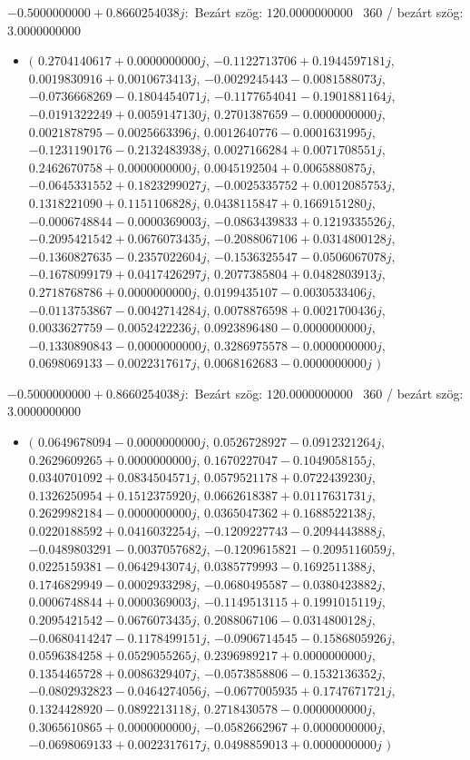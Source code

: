 \documentclass[14pt,a4paper]{article}
\begin{document}
$-0.5000000000+0.8660254038j$:\
Bezárt szög: $120.0000000000$ \
360 / bezárt szög: $3.0000000000$\
\begin{itemize}
\item
$\big($
$0.2704140617+0.0000000000j$, $-0.1122713706+0.1944597181j$, $0.0019830916+0.0010673413j$, $-0.0029245443-0.0081588073j$, $-0.0736668269-0.1804454071j$, $-0.1177654041-0.1901881164j$, $-0.0191322249+0.0059147130j$, $0.2701387659-0.0000000000j$, $0.0021878795-0.0025663396j$, $0.0012640776-0.0001631995j$, $-0.1231190176-0.2132483938j$, $0.0027166284+0.0071708551j$, $0.2462670758+0.0000000000j$, $0.0045192504+0.0065880875j$, $-0.0645331552+0.1823299027j$, $-0.0025335752+0.0012085753j$, $0.1318221090+0.1151106828j$, $0.0438115847+0.1669151280j$, $-0.0006748844-0.0000369003j$, $-0.0863439833+0.1219335526j$, $-0.2095421542+0.0676073435j$, $-0.2088067106+0.0314800128j$, $-0.1360827635-0.2357022604j$, $-0.1536325547-0.0506067078j$, $-0.1678099179+0.0417426297j$, $0.2077385804+0.0482803913j$, $0.2718768786+0.0000000000j$, $0.0199435107-0.0030533406j$, $-0.0113753867-0.0042714284j$, $0.0078876598+0.0021700436j$, $0.0033627759-0.0052422236j$, $0.0923896480-0.0000000000j$, $-0.1330890843-0.0000000000j$, $0.3286975578-0.0000000000j$, $0.0698069133-0.0022317617j$, $0.0068162683-0.0000000000j$
$\big)$
\end{itemize}
$-0.5000000000+0.8660254038j$:\
Bezárt szög: $120.0000000000$ \
360 / bezárt szög: $3.0000000000$\
\begin{itemize}
\item
$\big($
$0.0649678094-0.0000000000j$, $0.0526728927-0.0912321264j$, $0.2629609265+0.0000000000j$, $0.1670227047-0.1049058155j$, $0.0340701092+0.0834504571j$, $0.0579521178+0.0722439230j$, $0.1326250954+0.1512375920j$, $0.0662618387+0.0117631731j$, $0.2629982184-0.0000000000j$, $0.0365047362+0.1688522138j$, $0.0220188592+0.0416032254j$, $-0.1209227743-0.2094443888j$, $-0.0489803291-0.0037057682j$, $-0.1209615821-0.2095116059j$, $0.0225159381-0.0642943074j$, $0.0385779993-0.1692511388j$, $0.1746829949-0.0002933298j$, $-0.0680495587-0.0380423882j$, $0.0006748844+0.0000369003j$, $-0.1149513115+0.1991015119j$, $0.2095421542-0.0676073435j$, $0.2088067106-0.0314800128j$, $-0.0680414247-0.1178499151j$, $-0.0906714545-0.1586805926j$, $0.0596384258+0.0529055265j$, $0.2396989217+0.0000000000j$, $0.1354465728+0.0086329407j$, $-0.0573858806-0.1532136352j$, $-0.0802932823-0.0464274056j$, $-0.0677005935+0.1747671721j$, $0.1324428920-0.0892213118j$, $0.2718430578-0.0000000000j$, $0.3065610865+0.0000000000j$, $-0.0582662967+0.0000000000j$, $-0.0698069133+0.0022317617j$, $0.0498859013+0.0000000000j$
$\big)$
\end{itemize}
\end{document}
